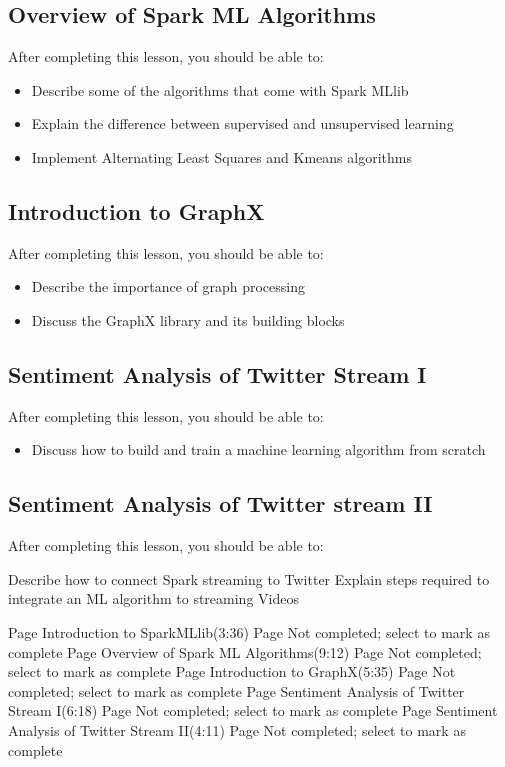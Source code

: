 \subsection{Overview of Spark ML Algorithms}

After completing this lesson, you should be able to:
\begin{itemize}
\item Describe some of the algorithms that come with Spark MLlib
\item Explain the difference between supervised and unsupervised learning
\item Implement Alternating Least Squares and Kmeans algorithms
\end{itemize}

\subsection{Introduction to GraphX}

After completing this lesson, you should be able to:
\begin{itemize}
\item Describe the importance of graph processing
\item Discuss the GraphX library and its building blocks
\end{itemize}
\subsection{Sentiment Analysis of Twitter Stream I}

After completing this lesson, you should be able to:

\begin{itemize}
\itme Describe Naïve Bayes algorithm
\item Discuss how to build and train a machine learning algorithm from scratch
\end{itemize}
\subsection{Sentiment Analysis of Twitter stream II}

After completing this lesson, you should be able to:

Describe how to connect Spark streaming to Twitter
Explain steps required to integrate an ML algorithm to streaming
Videos

Page Introduction to SparkMLlib(3:36) Page Not completed; select to mark as complete
Page Overview of Spark ML Algorithms(9:12) Page Not completed; select to mark as complete
Page Introduction to GraphX(5:35) Page Not completed; select to mark as complete
Page Sentiment Analysis of Twitter Stream I(6:18) Page Not completed; select to mark as complete
Page Sentiment Analysis of Twitter Stream II(4:11) Page Not completed; select to mark as complete



